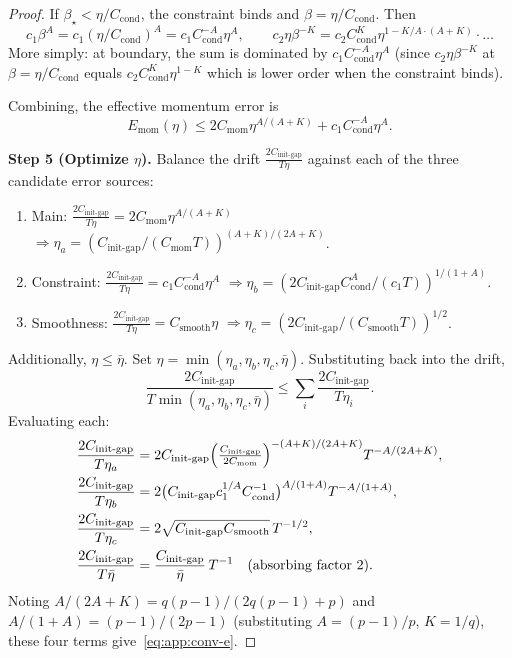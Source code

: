 \documentclass{article}
\theoremstyle{plain}
\theoremstyle{definition}
\theoremstyle{remark}
\begin{document}
\begin{proof}
If $\beta_\star < \eta/C_{\mathrm{cond}}$, the constraint binds and
$\beta = \eta/C_{\mathrm{cond}}$. Then
\[
  c_1\beta^A = c_1(\eta/C_{\mathrm{cond}})^A = c_1 C_{\mathrm{cond}}^{-A}\eta^A,
  \qquad
  c_2\eta\beta^{-K} = c_2 C_{\mathrm{cond}}^K\eta^{1-K/A\cdot(A+K)}\cdot\ldots
\]
More simply: at boundary, the sum is dominated by $c_1 C_{\mathrm{cond}}^{-A}\eta^A$
(since $c_2\eta\beta^{-K}$ at $\beta = \eta/C_{\mathrm{cond}}$ equals
$c_2 C_{\mathrm{cond}}^K\eta^{1-K}$ which is lower order when the constraint
binds).

Combining, the effective momentum error is
\[
  E_{\mathrm{mom}}(\eta)
  \leq 2C_{\mathrm{mom}}\eta^{A/(A+K)} + c_1 C_{\mathrm{cond}}^{-A}\eta^A.
\]

\smallskip\noindent\textbf{Step 5 (Optimize $\eta$).}
Balance the drift $\tfrac{2C_{\mathrm{init\text{-}gap}}}{T\eta}$ against
each of the three candidate error sources:
\begin{enumerate}[topsep=2pt,itemsep=0pt]
  \item[(a)] Main: $\tfrac{2C_{\mathrm{init\text{-}gap}}}{T\eta} = 2C_{\mathrm{mom}}\eta^{A/(A+K)}$
    $\Rightarrow \eta_a = (C_{\mathrm{init\text{-}gap}}/(C_{\mathrm{mom}}T))^{(A+K)/(2A+K)}$.
  \item[(b)] Constraint: $\tfrac{2C_{\mathrm{init\text{-}gap}}}{T\eta} = c_1 C_{\mathrm{cond}}^{-A}\eta^A$
    $\Rightarrow \eta_b = (2C_{\mathrm{init\text{-}gap}} C_{\mathrm{cond}}^A/(c_1 T))^{1/(1+A)}$.
  \item[(c)] Smoothness: $\tfrac{2C_{\mathrm{init\text{-}gap}}}{T\eta} = C_{\mathrm{smooth}}\eta$
    $\Rightarrow \eta_c = (2C_{\mathrm{init\text{-}gap}}/(C_{\mathrm{smooth}} T))^{1/2}$.
\end{enumerate}
Additionally, $\eta \leq \bar\eta$. Set $\eta = \min(\eta_a, \eta_b, \eta_c, \bar\eta)$.
Substituting back into the drift,
\[
  \frac{2C_{\mathrm{init\text{-}gap}}}{T\min(\eta_a, \eta_b, \eta_c, \bar\eta)}
  \leq \sum_i \frac{2C_{\mathrm{init\text{-}gap}}}{T\eta_i}.
\]
Evaluating each:
\begin{align*}
  \frac{2C_{\mathrm{init\text{-}gap}}}{T\eta_a}
  &= 2C_{\mathrm{init\text{-}gap}}\Bigl(\tfrac{C_{\mathrm{init\text{-}gap}}}{2 C_{\mathrm{mom}}}\Bigr)^{-(A+K)/(2A+K)}
     T^{-A/(2A+K)},
  \\
  \frac{2C_{\mathrm{init\text{-}gap}}}{T\eta_b}
  &= 2\bigl(C_{\mathrm{init\text{-}gap}} c_1^{1/A} C_{\mathrm{cond}}^{-1}\bigr)^{A/(1+A)} T^{-A/(1+A)},
  \\
  \frac{2C_{\mathrm{init\text{-}gap}}}{T\eta_c}
  &= 2\sqrt{C_{\mathrm{init\text{-}gap}} C_{\mathrm{smooth}}}\, T^{-1/2},
  \\
  \frac{2C_{\mathrm{init\text{-}gap}}}{T\bar\eta}
  &= \frac{C_{\mathrm{init\text{-}gap}}}{\bar\eta}\, T^{-1}\quad (\text{absorbing factor 2}).
\end{align*}
Noting $A/(2A+K) = q(p-1)/(2q(p-1)+p)$ and $A/(1+A) = (p-1)/(2p-1)$
(substituting $A = (p-1)/p$, $K = 1/q$), these four terms
give~\eqref{eq:app:conv-e}.
\end{proof}
\end{document}
